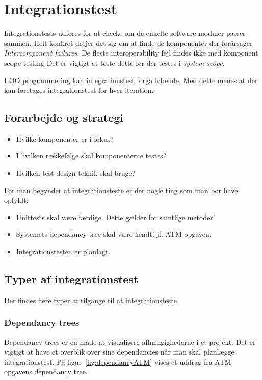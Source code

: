 \section{Integrationstest}
Integrationstests udføres for at checke om de enkelte software moduler passer sammen. Helt konkret drejer det sig om at finde de komponenter der forårsager \textit{Intercomponent failures}. De fleste interoperability fejl findes ikke med komponent scope testing Det er vigtigt at teste dette før der testes i \textit{system scope}.

I OO programmering kan integrationstest forgå løbende. Med dette menes at der kan foretages integrationstest for hver iteration. 

\subsection{Forarbejde og strategi}

\begin{itemize}
	\item Hvilke komponenter er i fokus?
	\item I hvilken rækkefølge skal komponenterne testes?
	\item Hvilken test design teknik skal bruge?
\end{itemize}

Før man begynder at integrationsteste er der nogle ting som man bør have opfyldt:

\begin{itemize}
	\item Unittests skal være færdige. Dette gælder for samtlige metoder!
	\item Systemets dependancy tree skal være kendt! jf. ATM opgaven.
	\item Integrationstesten er planlagt.
\end{itemize}

\subsection{Typer af integrationstest}
Der findes flere typer af tilgange til at integrationsteste.

\subsubsection{Dependancy trees}
Dependancy trees er en måde at visualisere afhængighederne i et projekt. Det er vigtigt at have et overblik over sine dependancies når man skal planlægge integrationstest. På figur~\ref{fig:dependancyATM} vises et uddrag fra ATM opgavens dependancy tree.

